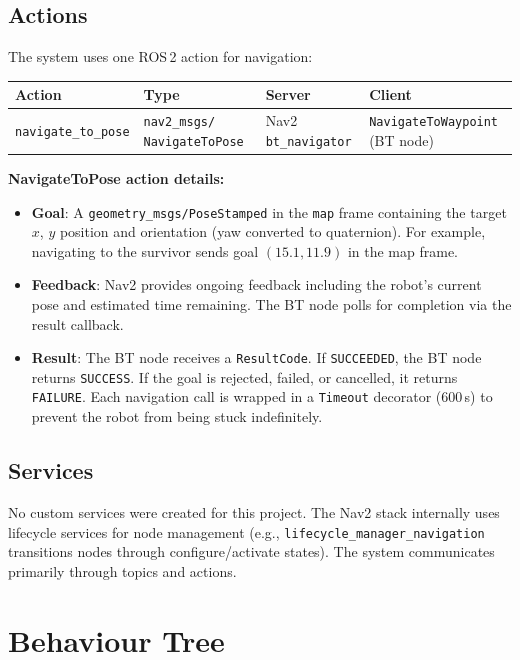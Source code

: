 \documentclass[12pt, a4paper]{article}
\begin{document}
\subsection{Actions}

The system uses one ROS\,2 action for navigation:

\begin{longtable}{L{3.5cm} L{3.5cm} L{3cm} L{3.5cm}}
    \toprule
    \textbf{Action} & \textbf{Type} & \textbf{Server} & \textbf{Client} \\
    \midrule
    \texttt{navigate\_to\_pose} & \texttt{nav2\_msgs/ NavigateToPose} & Nav2 \texttt{bt\_navigator} & \texttt{NavigateToWaypoint} (BT node) \\
    \bottomrule
\end{longtable}

\textbf{NavigateToPose action details:}

\begin{itemize}
    \item \textbf{Goal}: A \texttt{geometry\_msgs/PoseStamped} in the \texttt{map} frame containing the target $x$, $y$ position and orientation (yaw converted to quaternion). For example, navigating to the survivor sends goal $(15.1, 11.9)$ in the map frame.
    \item \textbf{Feedback}: Nav2 provides ongoing feedback including the robot's current pose and estimated time remaining. The BT node polls for completion via the result callback.
    \item \textbf{Result}: The BT node receives a \texttt{ResultCode}. If \texttt{SUCCEEDED}, the BT node returns \texttt{SUCCESS}. If the goal is rejected, failed, or cancelled, it returns \texttt{FAILURE}. Each navigation call is wrapped in a \texttt{Timeout} decorator (600\,s) to prevent the robot from being stuck indefinitely.
\end{itemize}

\subsection{Services}

No custom services were created for this project. The Nav2 stack internally uses lifecycle services for node management (e.g., \texttt{lifecycle\_manager\_navigation} transitions nodes through configure/activate states). The system communicates primarily through topics and actions.


\newpage
\section{Behaviour Tree}
\end{document}
